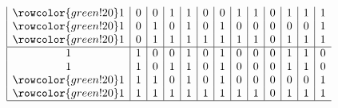\documentclass{article}
\begin{document}
\begin{enumerate}[label=(\alph*)]
\begin{enumerate}[label=\roman*.]
\begin{displaymath}
\begin{array}{|c|c|c|c|c|c|c|c|c|c|c|c|c}
            \rowcolor{green!20}
            1 & 0 & 0 & 1 & 1 & 0 & 0 & 1 & 1 & 0 & 1 & 1 & 1 \\
            \rowcolor{green!20}
            1 & 0 & 1 & 0 & 1 & 0 & 1 & 0 & 0 & 0 & 0 & 0 & 1 \\
            \rowcolor{green!20}
            1 & 0 & 1 & 1 & 1 & 1 & 1 & 1 & 1 & 0 & 1 & 1 & 1 \\
            \hline
            1 & 1 & 0 & 0 & 1 & 0 & 1 & 0 & 0 & 0 & 1 & 1 & 0 \\
            1 & 1 & 0 & 1 & 1 & 0 & 1 & 0 & 0 & 0 & 1 & 1 & 0 \\
            \rowcolor{green!20}
            1 & 1 & 1 & 0 & 1 & 0 & 1 & 0 & 0 & 0 & 0 & 0 & 1 \\
            \rowcolor{green!20}
            1 & 1 & 1 & 1 & 1 & 1 & 1 & 1 & 1 & 0 & 1 & 1 & 1 \\
            \hline
            \end{array}
        \end{displaymath}
        

\end{enumerate}
\end{enumerate}
\end{document}
